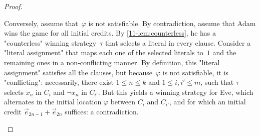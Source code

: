 \begin{proof}
\begin{scope}
    Conversely, assume that~$\varphi$ is not satisfiable.  By
    contradiction, assume that Adam wins the game for all initial
    credits.  By \cref{11-lem:counterless}, he has a "counterless" winning
    strategy~$\tau$ that selects a literal in every clause.  Consider
    a "literal assignment" that maps each one of the selected literals
    to~$1$ and the remaining ones in a non-conflicting manner.  By
    definition, this "literal assignment" satisfies all the clauses,
    but because~$\varphi$ is not satisfiable, it is "conflicting":
    necessarily, there exist $1\leq n\leq k$ and $1\leq i,i'\leq m$,
    such that $\tau$ selects $x_n$ in $C_i$ and $\neg x_n$ in
    $C_{i'}$.  But this yields a winning strategy for Eve, which
    alternates in the initial location $\varphi$ between $C_{i}$
    and $C_{i'}$, and for which an initial credit
    $\vec e_{2n-1}+\vec e_{2n}$ suffices: a contradiction.
  \end{scope}

\end{proof}
